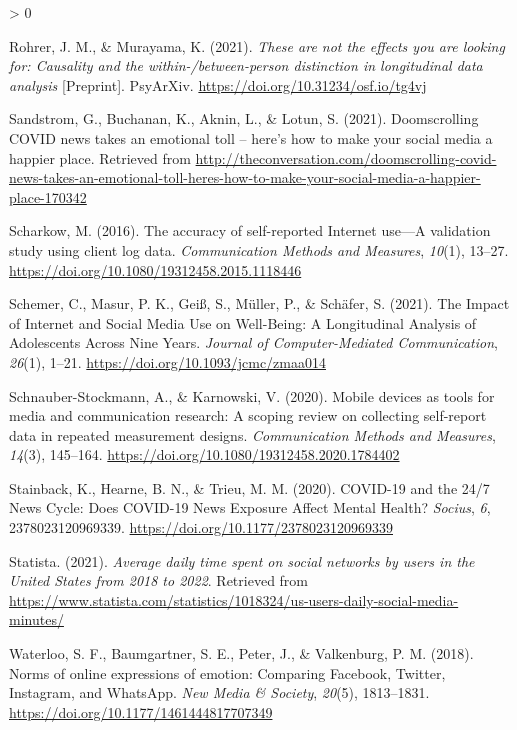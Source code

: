 \documentclass[
  english,
  man,mask,floatsintext]{apa6}
\newlength{\cslhangindent}
\newenvironment{CSLReferences}[2] %
 {%
  \setlength{\parindent}{0pt}
  \ifodd #1 \everypar{\setlength{\hangindent}{\cslhangindent}}\ignorespaces\fi
  \ifnum #2 > 0
  \setlength{\parskip}{#2\baselineskip}
  \fi
 }%
 {}
\begin{document}
\begin{CSLReferences}{1}{0}
\leavevmode\hypertarget{ref-rohrerTheseAreNot2021}{}%
Rohrer, J. M., \& Murayama, K. (2021). \emph{These are not the effects you are looking for: {Causality} and the within-/between-person distinction in longitudinal data analysis} {[}Preprint{]}. PsyArXiv. \url{https://doi.org/10.31234/osf.io/tg4vj}

\leavevmode\hypertarget{ref-sandstromDoomscrollingCOVIDNews2021}{}%
Sandstrom, G., Buchanan, K., Aknin, L., \& Lotun, S. (2021). Doomscrolling {COVID} news takes an emotional toll -- here's how to make your social media a happier place. Retrieved from \url{http://theconversation.com/doomscrolling-covid-news-takes-an-emotional-toll-heres-how-to-make-your-social-media-a-happier-place-170342}

\leavevmode\hypertarget{ref-scharkowAccuracySelfreportedInternet2016}{}%
Scharkow, M. (2016). The accuracy of self-reported {Internet} use---{A} validation study using client log data. \emph{Communication Methods and Measures}, \emph{10}(1), 13--27. \url{https://doi.org/10.1080/19312458.2015.1118446}

\leavevmode\hypertarget{ref-schemerImpactInternetSocial2021}{}%
Schemer, C., Masur, P. K., Geiß, S., Müller, P., \& Schäfer, S. (2021). The {Impact} of {Internet} and {Social} {Media} {Use} on {Well}-{Being}: {A} {Longitudinal} {Analysis} of {Adolescents} {Across} {Nine} {Years}. \emph{Journal of Computer-Mediated Communication}, \emph{26}(1), 1--21. \url{https://doi.org/10.1093/jcmc/zmaa014}

\leavevmode\hypertarget{ref-schnauber-stockmannMobileDevicesTools2020}{}%
Schnauber-Stockmann, A., \& Karnowski, V. (2020). Mobile devices as tools for media and communication research: {A} scoping review on collecting self-report data in repeated measurement designs. \emph{Communication Methods and Measures}, \emph{14}(3), 145--164. \url{https://doi.org/10.1080/19312458.2020.1784402}

\leavevmode\hypertarget{ref-stainbackCOVID1924News2020}{}%
Stainback, K., Hearne, B. N., \& Trieu, M. M. (2020). {COVID}-19 and the 24/7 {News} {Cycle}: {Does} {COVID}-19 {News} {Exposure} {Affect} {Mental} {Health}? \emph{Socius}, \emph{6}, 2378023120969339. \url{https://doi.org/10.1177/2378023120969339}

\leavevmode\hypertarget{ref-statistaAverageDailyTime2021}{}%
Statista. (2021). \emph{Average daily time spent on social networks by users in the {United} {States} from 2018 to 2022}. Retrieved from \url{https://www.statista.com/statistics/1018324/us-users-daily-social-media-minutes/}

\leavevmode\hypertarget{ref-waterlooNormsOnlineExpressions2018}{}%
Waterloo, S. F., Baumgartner, S. E., Peter, J., \& Valkenburg, P. M. (2018). Norms of online expressions of emotion: {Comparing} {Facebook}, {Twitter}, {Instagram}, and {WhatsApp}. \emph{New Media \& Society}, \emph{20}(5), 1813--1831. \url{https://doi.org/10.1177/1461444817707349}

\end{CSLReferences}
\end{document}
